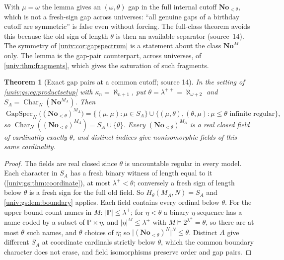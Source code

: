 \documentclass[11pt,letterpaper]{article}
\numberwithin{equation}{section}
\newtheorem{theorem}{Theorem}[section]
\theoremstyle{definition}
\theoremstyle{remark}
\newcommand{\No}{\mathbf{No}}
\newcommand{\NoM}{\No^{M}}
\newcommand{\cf}{\operatorname{cf}}
\newcommand{\GapSpec}{\operatorname{GapSpec}}
\newcommand{\abs}[1]{\lvert#1\rvert}
\newcommand{\Char}{\operatorname{Char}}
\begin{document}
With $\mu=\omega$ the lemma gives an $(\omega,\theta)$ gap in the full internal cutoff
$\No_{<\theta}$, which is not a fresh-sign gap across universes: ``all genuine gaps of a
birthday cutoff are symmetric'' is false even without forcing. The full-class theorem avoids
this because the old sign of length $\theta$ is then an available separator (source~14). The
symmetry of \cref{univ:cor:gapspectrum} is a statement about the class $\NoM$ only. The lemma
is the gap-pair counterpart, across universes, of \cref{univ:thm:fragments}, which gives the
saturation of such fragments.

\noindent[Added 3 October 2026, batch~81: for $M=N$ the lemma is extended to every infinite
cardinal $\theta$, singular $\theta$ and $\theta=\omega$ included, by source~17 of the report
\nolinkurl{Algebra/SurrealNumbers/docs/foundations-and-computation/surreal-well-orders/}
(its Theorem~29.4, \nolinkurl{swo:gs:thm:alphabet-gaps}): with $r=\cf\theta$ the gap pairs of
$\No_{<\theta}$ are $(r,r)$ and $(\rho,r)$, $(r,\rho)$ for the infinite regular $\rho<\theta$.]

\begin{theorem}[Exact gap pairs at a common cutoff; source 14]\label{univ:gs:thm:cutoff}
In the setting of \eqref{univ:gs:eq:productsetup} with $\kappa_n=\aleph_{n+1}$, put
$\theta=\lambda^{++}=\aleph_{\omega+2}$ and $S_A=\Char_N(\No^{M_A})$. Then
\[
 \GapSpec_N\bigl((\No_{<\theta})^{M_A}\bigr)=\{(\mu,\mu):\mu\in S_A\}\cup
 \{(\mu,\theta),(\theta,\mu):\mu\le\theta\text{ infinite regular}\},
\]
so $\Char_N((\No_{<\theta})^{M_A})=S_A\cup\{\theta\}$. Every $(\No_{<\theta})^{M_A}$ is a real
closed field of cardinality exactly $\theta$, and distinct indices give nonisomorphic fields
of this same cardinality.
\end{theorem}
\begin{proof}
The fields are real closed since $\theta$ is uncountable regular in every model. Each
character in $S_A$ has a fresh binary witness of length equal to it
(\cref{univ:gs:thm:coordinate}), at most $\lambda^+<\theta$; conversely a fresh sign of
length below $\theta$ is a fresh sign for the full old field. So $H_\theta(M_A,N)=S_A$ and
\cref{univ:gs:lem:boundary} applies. Each field contains every ordinal below $\theta$. For the
upper bound count names in $M$: $\abs{\mathbb P}\le\lambda^+$; for $\eta<\theta$ a binary
$\eta$-sequence has a name coded by a subset of $\mathbb P\times\eta$, and
$\abs\eta^M\le\lambda^+$ with $M\models2^{\lambda^+}=\theta$, so there are at most $\theta$
such names, and $\theta$ choices of $\eta$; so $\abs{(\No_{<\theta})^N}^N\le\theta$. Distinct
$A$ give different $S_A$ at coordinate cardinals strictly below $\theta$, which the common
boundary character does not erase, and field isomorphisms preserve order and gap pairs.
\end{proof}
\end{document}

